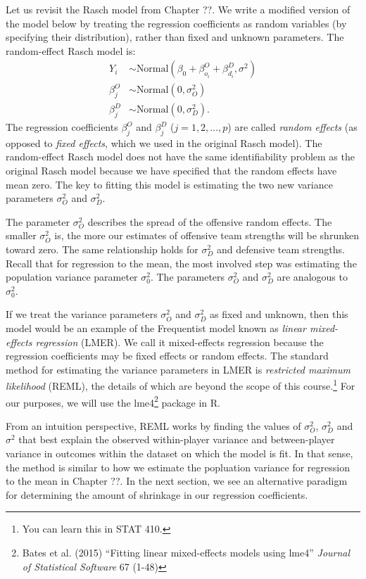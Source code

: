 \documentclass{article}
\begin{document}
  Let us revisit the Rasch model from Chapter ??. We write a modified version of the model below by treating the regression coefficients as random variables (by specifying their distribution), rather than fixed and unknown parameters. The random-effect Rasch model is:
  \begin{equation*}
    \begin{split}
      Y_i &\sim \mbox{Normal}(\beta_0 + \beta^O_{o_i} + \beta^D_{d_i}, \sigma^2)\\
      \beta^O_j &\sim \mbox{Normal}(0, \sigma^2_O)\\
      \beta^D_j &\sim \mbox{Normal}(0, \sigma^2_D).
    \end{split}
  \end{equation*}
  The regression coefficients $\beta^O_j$ and $\beta^D_j$ ($j = 1, 2, ..., p$) are called {\it random effects} (as opposed to {\it fixed effects}, which we used in the original Rasch model). The random-effect Rasch model does not have the same identifiability problem as the original Rasch model because we have specified that the random effects have mean zero. The key to fitting this model is estimating the two new variance parameters $\sigma^2_O$ and $\sigma^2_D$.

  The parameter $\sigma^2_O$ describes the spread of the offensive random effects. The smaller $\sigma^2_O$ is, the more our estimates of offensive team strengths will be shrunken toward zero. The same relationship holds for $\sigma^2_D$ and defensive team strengths. Recall that for regression to the mean, the most involved step was estimating the population variance parameter $\sigma^2_0$. The parameters $\sigma^2_O$ and $\sigma^2_D$ are analogous to $\sigma^2_0$.
  
  If we treat the variance parameters $\sigma^2_O$ and $\sigma^2_D$ as fixed and unknown, then this model would be an example of the Frequentist model known as {\it linear mixed-effects regression} (LMER). We call it mixed-effects regression because the regression coefficients may be fixed effects or random effects. The standard method for estimating the variance parameters in LMER is {\it restricted maximum likelihood} (REML), the details of which are beyond the scope of this course.\footnote{You can learn this in STAT 410.} For our purposes, we will use the lme4\footnote{Bates et al. (2015) ``Fitting linear mixed-effects models using lme4'' {\it Journal of Statistical Software} 67 (1-48)} package in R.

  From an intuition perspective, REML works by finding the values of $\sigma^2_O$, $\sigma^2_D$ and $\sigma^2$ that best explain the observed within-player variance and between-player variance in outcomes within the dataset on which the model is fit. In that sense, the method is similar to how we estimate the popluation variance for regression to the mean in Chapter ??. In the next section, we see an alternative paradigm for determining the amount of shrinkage in our regression coefficients.
\end{document}
